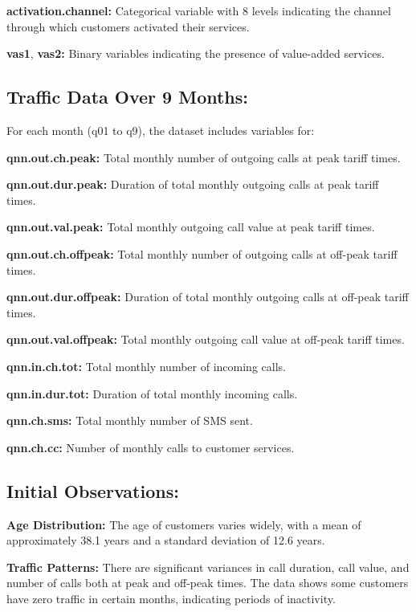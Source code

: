 \documentclass[
]{article}
\begin{document}
\textbf{activation.channel:} Categorical variable with 8 levels
indicating the channel through which customers activated their services.

\textbf{vas1}, \textbf{vas2:} Binary variables indicating the presence
of value-added services.

\hypertarget{traffic-data-over-9-months}{%
\subsection{Traffic Data Over 9
Months:}\label{traffic-data-over-9-months}}

For each month (q01 to q9), the dataset includes variables for:

\textbf{qnn.out.ch.peak:} Total monthly number of outgoing calls at peak
tariff times.

\textbf{qnn.out.dur.peak:} Duration of total monthly outgoing calls at
peak tariff times.

\textbf{qnn.out.val.peak:} Total monthly outgoing call value at peak
tariff times.

\textbf{qnn.out.ch.offpeak:} Total monthly number of outgoing calls at
off-peak tariff times.

\textbf{qnn.out.dur.offpeak:} Duration of total monthly outgoing calls
at off-peak tariff times.

\textbf{qnn.out.val.offpeak:} Total monthly outgoing call value at
off-peak tariff times.

\textbf{qnn.in.ch.tot:} Total monthly number of incoming calls.

\textbf{qnn.in.dur.tot:} Duration of total monthly incoming calls.

\textbf{qnn.ch.sms:} Total monthly number of SMS sent.

\textbf{qnn.ch.cc:} Number of monthly calls to customer services.

\hypertarget{initial-observations}{%
\subsection{Initial Observations:}\label{initial-observations}}

\textbf{Age Distribution:} The age of customers varies widely, with a
mean of approximately 38.1 years and a standard deviation of 12.6 years.

\textbf{Traffic Patterns:} There are significant variances in call
duration, call value, and number of calls both at peak and off-peak
times. The data shows some customers have zero traffic in certain
months, indicating periods of inactivity.
\end{document}
